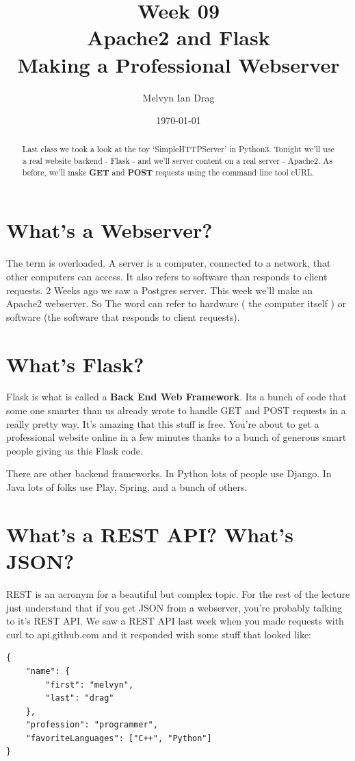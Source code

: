 \documentclass[10pt]{article}
\title{\textbf{Week 09} \\
\LARGE Apache2 and Flask \\
\Large Making a Professional Webserver}
\author{
	Melvyn Ian Drag
}
\date{\today}
\begin{document}
\maketitle

\begin{abstract}
Last class we took a look at the toy `SimpleHTTPServer' in Python3. Tonight we'll use a real website backend - Flask - and we'll server content on a real server - Apache2. As before, we'll make \textbf{GET} and \textbf{POST} requests using the command line tool cURL.
\end{abstract}

\section{What's a Webserver?}
The term is overloaded. A server is a computer, connected to a network, that
other computers can access. It also refers to software than responds to client
requests. 2 Weeks ago we saw a Postgres server. This week we'll make an Apache2
webserver. So The word can refer to hardware ( the computer itself ) or software
(the software that responds to client requests).

\section{What's Flask?}
Flask is what is called a \textbf{Back End Web Framework}. Its a bunch of code
that some one smarter than us already wrote to handle GET and POST requests in a
really pretty way. It's amazing that this stuff is free. You're about to get a
professional website online in a few minutes thanks to a bunch of generous smart
people giving us this Flask code.

There are other backend frameworks. In Python lots of people use Django. In Java
lots of folks use Play, Spring, and a bunch of others.

\section{What's a REST API? What's JSON? }
REST is an acronym for a beautiful but complex
topic. For the rest of the lecture just understand that if you get JSON from a
webserver, you're probably talking to it's REST API. We saw a REST API last week
when you made requests with curl to api.github.com and it responded with some
stuff that looked like:
 
\begin{verbatim}
{
	"name": {
		"first": "melvyn",
		"last": "drag"
	},
	"profession": "programmer",
	"favoriteLanguages": ["C++", "Python"]
}
\end{verbatim}
\end{document}
